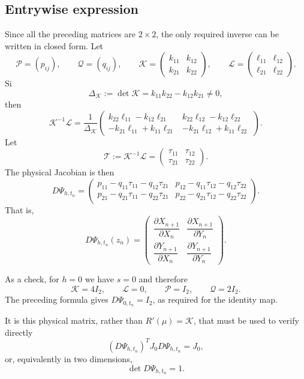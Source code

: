 \documentclass[11pt,a4paper]{article}
\newcommand{\Id}{I}
\begin{document}
\subsection{Entrywise expression}

Since all the preceding matrices are $2\times2$, the only required inverse can be written
in closed form. Let
\[
 \mathcal P=(p_{ij}),
 \qquad
 \mathcal Q=(q_{ij}),
 \qquad
 \mathcal K=
 \begin{pmatrix}k_{11}&k_{12}\\k_{21}&k_{22}\end{pmatrix},
 \qquad
 \mathcal L=
 \begin{pmatrix}\ell_{11}&\ell_{12}\\\ell_{21}&\ell_{22}\end{pmatrix}.
\]
Si
\[
 \Delta_{\mathcal K}
 :=\det\mathcal K
 =k_{11}k_{22}-k_{12}k_{21}\neq0,
\]
then
\[
 \mathcal K^{-1}\mathcal L
 =\frac{1}{\Delta_{\mathcal K}}
 \begin{pmatrix}
  k_{22}\ell_{11}-k_{12}\ell_{21}
  &k_{22}\ell_{12}-k_{12}\ell_{22}\\
  -k_{21}\ell_{11}+k_{11}\ell_{21}
  &-k_{21}\ell_{12}+k_{11}\ell_{22}
 \end{pmatrix}.
\]
Let
\[
 \mathcal T:=\mathcal K^{-1}\mathcal L
 =\begin{pmatrix}\tau_{11}&\tau_{12}\\\tau_{21}&\tau_{22}\end{pmatrix}.
\]
The physical Jacobian is then
\[
 \boxed{
 D\Psi_{h,t_n}=
 \begin{pmatrix}
  p_{11}-q_{11}\tau_{11}-q_{12}\tau_{21}
  &p_{12}-q_{11}\tau_{12}-q_{12}\tau_{22}\\[1mm]
  p_{21}-q_{21}\tau_{11}-q_{22}\tau_{21}
  &p_{22}-q_{21}\tau_{12}-q_{22}\tau_{22}
 \end{pmatrix}.
 }
\]
That is,
\[
 D\Psi_{h,t_n}(z_n)=
 \begin{pmatrix}
  \dfrac{\partial X_{n+1}}{\partial X_n}
  &\dfrac{\partial X_{n+1}}{\partial Y_n}\\[2mm]
  \dfrac{\partial Y_{n+1}}{\partial X_n}
  &\dfrac{\partial Y_{n+1}}{\partial Y_n}
 \end{pmatrix}.
\]

As a check, for $h=0$ we have $s=0$ and therefore
\[
 \mathcal K=4\Id_2,
 \qquad
 \mathcal L=0,
 \qquad
 \mathcal P=\Id_2,
 \qquad
 \mathcal Q=2\Id_2.
\]
The preceding formula gives $D\Psi_{0,t_n}=\Id_2$, as required for the identity map.

It is this physical matrix, rather than $R'(\mu)=\mathcal K$, that must be used to verify directly
\[
 (D\Psi_{h,t_n})^TJ_0D\Psi_{h,t_n}=J_0,
\]
or, equivalently in two dimensions,
\[
 \det D\Psi_{h,t_n}=1.
\]
\end{document}
